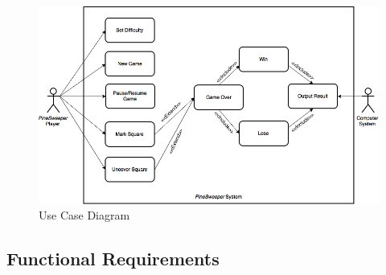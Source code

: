 \documentclass[12pt, titlepage]{article}
\begin{document}
\begin{figure}[!h]
	\includegraphics[width=\linewidth] {UseCase.png}
	\caption{Use Case Diagram}
\end{figure}

\newpage
\subsection{Functional Requirements}
\end{document}
